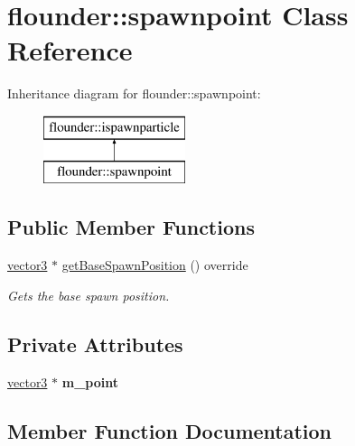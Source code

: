 \hypertarget{classflounder_1_1spawnpoint}{}\section{flounder\+:\+:spawnpoint Class Reference}
\label{classflounder_1_1spawnpoint}
Inheritance diagram for flounder\+:\+:spawnpoint\+:\begin{figure}[H]
\begin{center}
\leavevmode
\includegraphics[height=2.000000cm]{classflounder_1_1spawnpoint}
\end{center}
\end{figure}
\subsection*{Public Member Functions}
\begin{DoxyCompactItemize}
\item 
\hyperlink{classflounder_1_1vector3}{vector3} $\ast$ \hyperlink{classflounder_1_1spawnpoint_a6c1f80efbeb2ff178c9227855e069ea8}{get\+Base\+Spawn\+Position} () override
\begin{DoxyCompactList}\small\item\em Gets the base spawn position. \end{DoxyCompactList}\end{DoxyCompactItemize}
\subsection*{Private Attributes}
\begin{DoxyCompactItemize}
\item 
\mbox{\label{classflounder_1_1spawnpoint_ac53cf6179d3a81616afcd2be0a951a7e}} 
\hyperlink{classflounder_1_1vector3}{vector3} $\ast$ {\bfseries m\+\_\+point}
\end{DoxyCompactItemize}


\subsection{Member Function Documentation}
\mbox{\label{classflounder_1_1spawnpoint_a6c1f80efbeb2ff178c9227855e069ea8}} 

